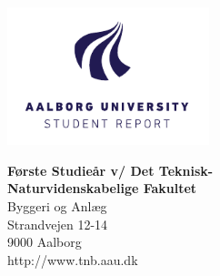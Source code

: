 {}
\thispagestyle{empty}

\begin{minipage}[t]{0.48\textwidth}
\vspace*{-25pt}			%
\includegraphics[height=4cm]{images/AAU-logo-stud-UK-RGB}
\end{minipage}
\hfill
\begin{minipage}[t]{0.48\textwidth}
{\small 
\textbf{Første Studieår v/ Det Teknisk-}\\
\textbf{Naturvidenskabelige Fakultet}  \\
Byggeri og Anlæg \\
Strandvejen 12-14 \\
9000 Aalborg \\
http://www.tnb.aau.dk}
\end{minipage}

\vspace*{1cm}

